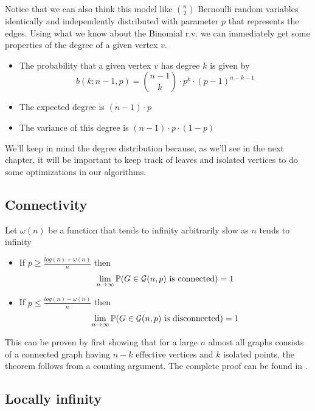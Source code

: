 Notice that we can also think this model like $\binom{n}{2}$ Bernoulli random variables identically and independently distributed with parameter $p$ that represents the edges. Using what we know about the Binomial r.v. we can immediately get some properties of the degree of a given vertex $v$. 

\begin{itemize}
\item The probability that a given vertex $v$ has degree $k$ is given by
$$b(k; n-1,p) = \binom{n-1}{k} \cdot p^{k} \cdot (p-1)^{n-k-1}$$
\item The expected degree is $(n-1)\cdot p$
\item The variance of this degree is $(n-1)\cdot p \cdot (1-p)$
\end{itemize}

We'll keep in mind the degree distribution because, as we'll see in the next chapter, it will be important to keep track of leaves and isolated vertices to do some optimizations in our algorithms.

\subsection{Connectivity}
\begin{theorem}
Let $\omega(n)$ be a function that tends to infinity arbitrarily slow as $n$ tends to infinity
\begin{itemize}
\item If $p\geq \frac{log(n)+ \omega(n)}{n}$ then 
$$\lim_{n \to \infty} \mathbb{P}(G \in \mathcal{G}(n,p) \text{ is connected}) = 1$$
\item If $p\leq \frac{log(n)- \omega(n)}{n}$ then
$$\lim_{n \to \infty} \mathbb{P}(G \in \mathcal{G}(n,p) \text{ is disconnected}) = 1$$
\end{itemize}
\end{theorem}
 
This can be proven by first showing that for a large $n$ almost all graphs consists of a connected graph having $n-k$ effective vertices and $k$ isolated points, the theorem follows from a counting argument. The complete proof can be found in \cite[Erdös-Rényi, 59]{OnRandomGraphs}.
 
\subsection{Locally infinity}

